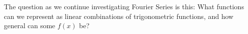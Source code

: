 \begin{problem}
\begin{enumerate}[(a)]
            The question as we continue investigating Fourier Series is this: What functions can we represent as linear combinations of trigonometric functions, and how general can some $f(x)$ be?

    \end{enumerate}

\end{problem}
